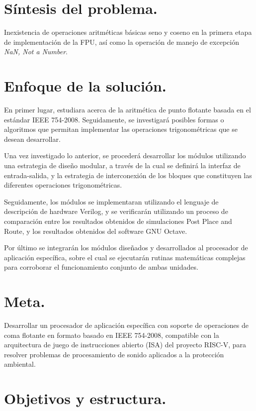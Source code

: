 \section{Síntesis del problema.}

Inexistencia de operaciones aritméticas básicas seno y coseno en la primera etapa de implementación de la FPU, así como la operación de manejo de excepción \textit{NaN, Not a Number}.

\section{Enfoque de la solución.}

En primer lugar,  estudiara acerca de la aritmética de punto flotante basada en el estándar IEEE 754-2008. Seguidamente, se investigará posibles formas o algoritmos que permitan implementar las operaciones trigonométricas que se desean desarrollar.

Una vez investigado lo anterior, se procederá desarrollar los módulos utilizando una estrategia de diseño modular, a través de la cual se definirá la interfaz de entrada-salida, y la estrategia de interconexión de los bloques que constituyen las diferentes operaciones trigonométricas.

Seguidamente, los módulos se implementaran utilizando el lenguaje de descripción de hardware Verilog, y se verificarán utilizando un proceso de comparación entre los resultados obtenidos de simulaciones Post Place and Route, y los resultados obtenidos del software GNU Octave.

Por último se integrarán los módulos diseñados y desarrollados al procesador de aplicación específica, sobre el cual se ejecutarán rutinas matemáticas complejas para corroborar el funcionamiento conjunto de ambas unidades.

\section{Meta.}

Desarrollar un procesador de aplicación específica con soporte de operaciones de coma flotante en formato basado en IEEE 754-2008, compatible con la arquitectura de juego de instrucciones abierto (ISA) del proyecto RISC-V, para resolver problemas de procesamiento de sonido aplicados a la protección ambiental.

\section{Objetivos y estructura.}

